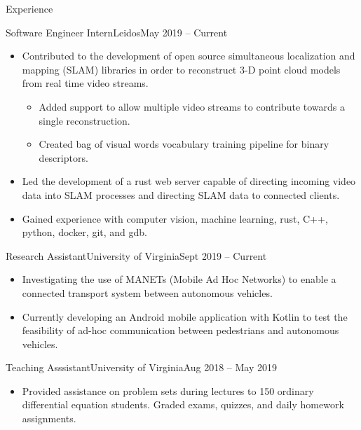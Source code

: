 \documentclass[]{mcdowellcv}
\begin{document}
\begin{cvsection}{Experience}
	\begin{cvsubsection}{Software Engineer Intern}{Leidos}{May 2019 -- Current}
		            
		\begin{itemize}%
			\item Contributed to the development of open source simultaneous localization and mapping (SLAM) libraries in order to reconstruct 3-D point cloud models from real time video streams.
			\begin{itemize}
				\item Added support to allow multiple video streams to contribute towards a single reconstruction.
				\item Created bag of visual words vocabulary training pipeline for binary descriptors.
			\end{itemize}
			
			\item Led the development of a rust web server capable of directing incoming video data into SLAM processes and directing SLAM data to connected clients.
			\item Gained experience with computer vision, machine learning, rust, C++, python, docker, git, and gdb.
		\end{itemize}
	\end{cvsubsection}
	\begin{cvsubsection}{Research Assistant}{University of Virginia}{Sept 2019 -- Current}
		            
		\begin{itemize}%
			\item Investigating the use of MANETs (Mobile Ad Hoc Networks) to enable a connected transport system between autonomous vehicles.
			\item Currently developing an Android mobile application with Kotlin to test the feasibility of ad-hoc communication between pedestrians and autonomous vehicles.
		\end{itemize}
	\end{cvsubsection}
	\begin{cvsubsection}{Teaching Asssistant}{University of Virginia}{Aug 2018 -- May 2019}
		            
		\begin{itemize}%
			\item Provided assistance on problem sets during lectures to 150 ordinary differential equation students.  Graded exams, quizzes, and daily homework assignments.
		\end{itemize}
	\end{cvsubsection}
\end{cvsection}
\end{document}

